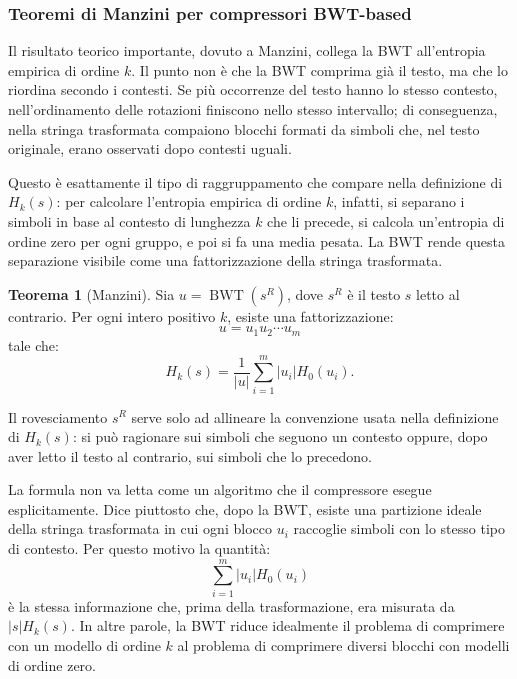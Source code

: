 \documentclass{article}
\theoremstyle{definition}
\newtheorem{theorem}{Teorema}[section] %
\numberwithin{equation}{section}
\begin{document}
\subsubsection{Teoremi di Manzini per compressori BWT-based}
Il risultato teorico importante, dovuto a Manzini, collega la BWT all'entropia empirica di ordine $k$. Il punto non è che la BWT comprima già il testo, ma che lo riordina secondo i contesti. Se più occorrenze del testo hanno lo stesso contesto, nell'ordinamento delle rotazioni finiscono nello stesso intervallo; di conseguenza, nella stringa trasformata compaiono blocchi formati da simboli che, nel testo originale, erano osservati dopo contesti uguali.

Questo è esattamente il tipo di raggruppamento che compare nella definizione di $H_k(s)$: per calcolare l'entropia empirica di ordine $k$, infatti, si separano i simboli in base al contesto di lunghezza $k$ che li precede, si calcola un'entropia di ordine zero per ogni gruppo, e poi si fa una media pesata. La BWT rende questa separazione visibile come una fattorizzazione della stringa trasformata.

\begin{theorem}[Manzini]
    Sia $u=\operatorname{BWT}(s^R)$, dove $s^R$ è il testo $s$ letto al contrario. Per ogni intero positivo $k$, esiste una fattorizzazione:
    \[
        u=u_1u_2\cdots u_m
    \]
    tale che:
    \begin{equation}\label{eq:manzini_partition}
        H_k(s)
        =
        \frac{1}{|u|}
        \sum_{i=1}^{m}
        |u_i|H_0(u_i).
    \end{equation}
\end{theorem}

Il rovesciamento $s^R$ serve solo ad allineare la convenzione usata nella definizione di $H_k(s)$: si può ragionare sui simboli che seguono un contesto oppure, dopo aver letto il testo al contrario, sui simboli che lo precedono.

La formula non va letta come un algoritmo che il compressore esegue esplicitamente. Dice piuttosto che, dopo la BWT, esiste una partizione ideale della stringa trasformata in cui ogni blocco $u_i$ raccoglie simboli con lo stesso tipo di contesto. Per questo motivo la quantità:
\[
    \sum_{i=1}^{m}|u_i|H_0(u_i)
\]
è la stessa informazione che, prima della trasformazione, era misurata da $|s|H_k(s)$. In altre parole, la BWT riduce idealmente il problema di comprimere con un modello di ordine $k$ al problema di comprimere diversi blocchi con modelli di ordine zero.
\end{document}
